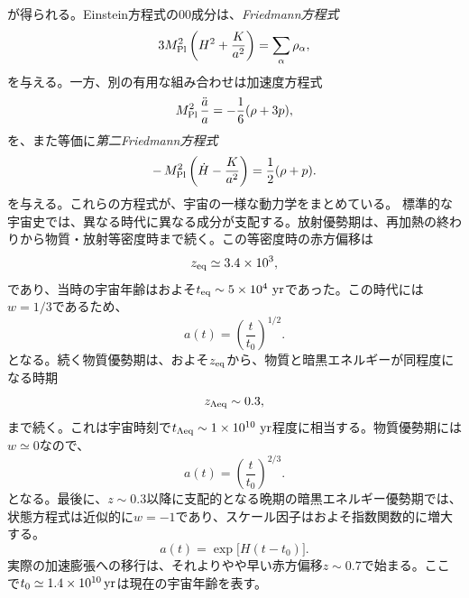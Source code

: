 \documentclass[a4paper,11pt,oneside]{article}
\theoremstyle{definition}
\numberwithin{equation}{section}
\begin{document}
が得られる。Einstein方程式の\(00\)成分は、\textit{Friedmann方程式}
\begin{equation}
3M_{\rm Pl}^2\left(H^2+\frac{K}{a^2}\right)=\sum_\alpha \rho_\alpha,
\end{equation}
を与える。一方、別の有用な組み合わせは加速度方程式
\begin{equation}
M_{\rm Pl}^2\,\frac{\ddot a}{a}=-\frac16(\rho+3p),
\end{equation}
を、また等価に\textit{第二Friedmann方程式}
\begin{equation}
-\,M_{\rm Pl}^2 \left(  \dot H -\frac{K}{a^{2}}\right)=\frac12(\rho+p).
\end{equation}
を与える。これらの方程式が、宇宙の一様な動力学をまとめている。
標準的な宇宙史では、異なる時代に異なる成分が支配する。放射優勢期は、再加熱の終わりから物質・放射等密度時まで続く。この等密度時の赤方偏移は
\begin{equation}
z_{\rm eq}\simeq 3.4\times 10^{3},
\end{equation}
であり、当時の宇宙年齢はおよそ$t_{\rm eq}\sim 5\times 10^{4}\ {\rm yr} $であった。この時代には\(w=1/3\)であるため、
\begin{equation}
a(t)=\left(\frac{t}{t_0}\right)^{1/2}.
\end{equation}
となる。続く物質優勢期は、およそ\(z_{\rm eq}\)から、物質と暗黒エネルギーが同程度になる時期
\begin{equation}
z_{\Lambda{\rm eq}}\sim 0.3,
\end{equation}
まで続く。これは宇宙時刻で$t_{\Lambda{\rm eq}}\sim 1\times 10^{10}\ {\rm yr} $程度に相当する。物質優勢期には\(w\simeq 0\)なので、
\begin{equation}
a(t)=\left(\frac{t}{t_0}\right)^{2/3}.
\end{equation}
となる。最後に、\(z\sim 0.3\)以降に支配的となる晩期の暗黒エネルギー優勢期では、状態方程式は近似的に\(w=-1\)であり、スケール因子はおよそ指数関数的に増大する。
\begin{equation}
a(t)=\exp\!\bigl[H(t-t_0)\bigr].
\end{equation}
実際の加速膨張への移行は、それよりやや早い赤方偏移\(z\sim 0.7\)で始まる。ここで\(t_0\simeq 1.4\times 10^{10}\,{\rm yr}\)は現在の宇宙年齢を表す。
\end{document}
